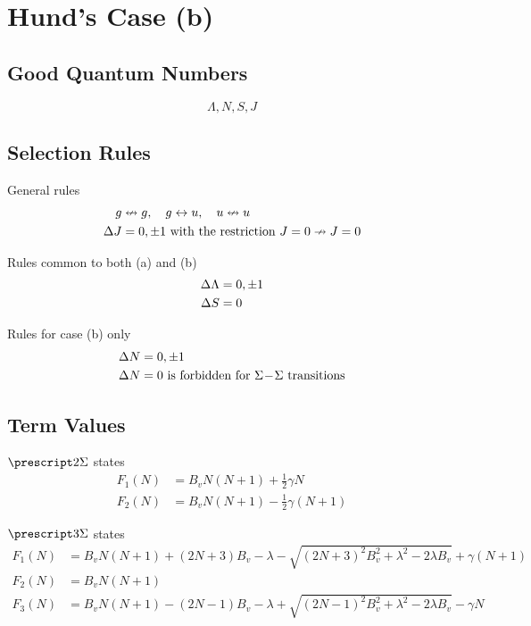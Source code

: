 \section{Hund's Case (b)}
\label{s:hunds_case_b}

\subsection{Good Quantum Numbers}

\begin{equation*}
    \Lambda, N, S, J
\end{equation*}

\subsection{Selection Rules}

General rules
\begin{align*}
    g        & \nleftrightarrow g, \quad g \leftrightarrow u, \quad u \nleftrightarrow u \\
    \adif{J} & = 0, \pm 1 \text{ with the restriction } J = 0 \nrightarrow J = 0
\end{align*}

Rules common to both (a) and (b)
\begin{align*}
    \adif{\Lambda} & = 0, \pm 1 \\
    \adif{S}       & = 0
\end{align*}

Rules for case (b) only
\begin{align*}
    \adif{N} & = 0, \pm 1                                                          \\
    \adif{N} & = 0 \text{ is forbidden for } \Sigma\dash\Sigma \text{ transitions}
\end{align*}

\subsection{Term Values}

$\state{2}{\Sigma}$ states
\begin{align*}
    F_{1}(N) & = B_{v}N(N + 1) + \tfrac{1}{2}\gamma N      \\
    F_{2}(N) & = B_{v}N(N + 1) - \tfrac{1}{2}\gamma(N + 1)
\end{align*}

$\state{3}{\Sigma}$ states
\begin{align*}
    F_{1}(N) & = B_{v}N(N + 1) + (2N + 3)B_{v} - \lambda - \sqrt{(2N + 3)^{2}B_{v}^{2} + \lambda^{2} - 2\lambda B_{v}} + \gamma(N + 1) \\
    F_{2}(N) & = B_{v}N(N + 1)                                                                                                         \\
    F_{3}(N) & = B_{v}N(N + 1) - (2N - 1)B_{v} - \lambda + \sqrt{(2N - 1)^{2}B_{v}^{2} + \lambda^{2} - 2\lambda B_{v}} - \gamma N
\end{align*}
